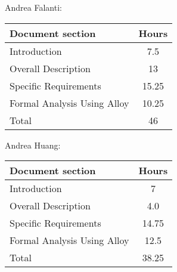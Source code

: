 Andrea Falanti:

\begin{tabular}{|l|c|}
    \hline
    Document section & Hours \\
    \hline
     Introduction & 7.5\\
     Overall Description & 13\\
     Specific Requirements & 15.25\\
     Formal Analysis Using Alloy & 10.25\\
     \hline
     Total & 46\\
     \hline
\end{tabular}
\vskip 0.3in

Andrea Huang:

\begin{tabular}{|l|c|}
    \hline
    Document section & Hours \\
    \hline
     Introduction &  7\\
     Overall Description & 4.0\\
     Specific Requirements & 14.75\\
     Formal Analysis Using Alloy & 12.5\\
     \hline
     Total & 38.25\\
     \hline
\end{tabular}